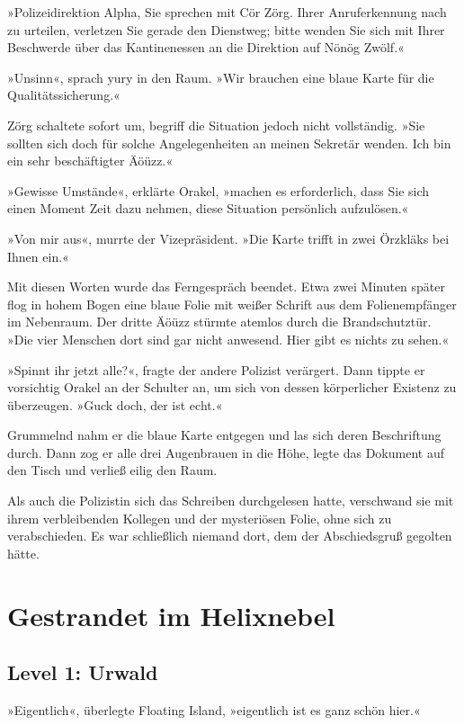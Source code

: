 »Polizeidirektion Alpha, Sie sprechen mit Cör Zörg. Ihrer Anruferkennung nach zu urteilen, verletzen Sie gerade den Dienstweg; bitte wenden Sie sich mit Ihrer Beschwerde über das Kantinenessen an die Direktion auf Nönög Zwölf.«

»Unsinn«, sprach yury in den Raum. »Wir brauchen eine blaue Karte für die Qualitätssicherung.«

Zörg schaltete sofort um, begriff die Situation jedoch nicht vollständig. »Sie sollten sich doch für solche Angelegenheiten an meinen Sekretär wenden. Ich bin ein sehr beschäftigter Äöüzz.«

»Gewisse Umstände«, erklärte Orakel, »machen es erforderlich, dass Sie sich einen Moment Zeit dazu nehmen, diese Situation persönlich aufzulösen.«

»Von mir aus«, murrte der Vizepräsident. »Die Karte trifft in zwei Örzkläks bei Ihnen ein.«

Mit diesen Worten wurde das Ferngespräch beendet. Etwa zwei Minuten später flog in hohem Bogen eine blaue Folie mit weißer Schrift aus dem Folienempfänger im Nebenraum. Der dritte Äöüzz stürmte atemlos durch die Brandschutztür. »Die vier Menschen dort sind gar nicht anwesend. Hier gibt es nichts zu sehen.«

»Spinnt ihr jetzt alle?«, fragte der andere Polizist verärgert. Dann tippte er vorsichtig Orakel an der Schulter an, um sich von dessen körperlicher Existenz zu überzeugen. »Guck doch, der ist echt.«

Grummelnd nahm er die blaue Karte entgegen und las sich deren Beschriftung durch. Dann zog er alle drei Augenbrauen in die Höhe, legte das Dokument auf den Tisch und verließ eilig den Raum.

Als auch die Polizistin sich das Schreiben durchgelesen hatte, verschwand sie mit ihrem verbleibenden Kollegen und der mysteriösen Folie, ohne sich zu verabschieden. Es war schließlich niemand dort, dem der Abschiedsgruß gegolten hätte.


\chapter{Gestrandet im Helixnebel}

\section{Level 1: Urwald}

»Eigentlich«, überlegte Floating Island, »eigentlich ist es ganz schön hier.«

